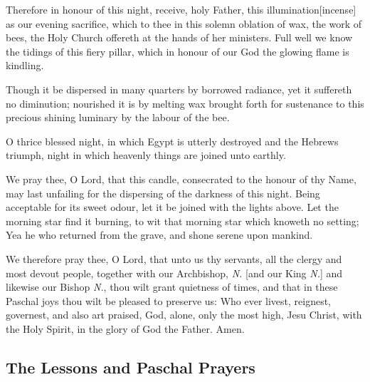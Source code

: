 Therefore in honour of this night, receive, holy Father, this illumination[incense]  as our evening sacrifice, which to thee in this solemn oblation of wax, the work of bees, the Holy Church offereth at the hands of her ministers. Full well we know the tidings of this fiery pillar, which in honour of our God the glowing flame is kindling.


{\centering{}\par}


Though it be dispersed in many quarters by borrowed radiance, yet it suffereth no diminution; nourished it is by melting wax brought forth for sustenance to this precious shining luminary by the labour of the bee.

O thrice blessed night, in which Egypt is utterly destroyed and the Hebrews triumph, night in which heavenly things are joined unto earthly.

We pray thee, O Lord, that this candle, consecrated to the honour of thy Name, may last unfailing for the dispersing of the darkness of this night.  Being acceptable for its sweet odour, let it be joined with the lights above. Let the morning star find it burning, to wit that morning star which knoweth no setting; Yea he who returned from the grave, and shone serene upon mankind.

We therefore pray thee, O Lord, that unto us thy servants, all the clergy and most devout people, together with our Archbishop, \emph{N.} [and our King \emph{N.}] and likewise our Bishop \emph{N.}, thou wilt grant quietness of times, and that in these Paschal joys thou wilt be pleased to preserve us:  Who ever livest, reignest, governest, and also art praised, God, alone, only the most high, Jesu Christ, with the Holy Spirit, in the glory of God the Father. \R Amen.



\subsection{The Lessons and Paschal Prayers}

